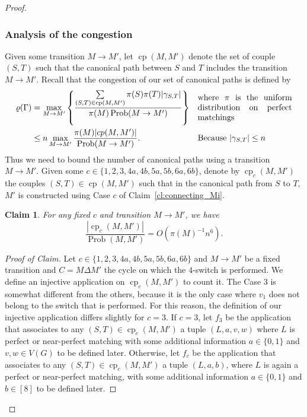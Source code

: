 \documentclass[11pt,a4paper]{article}
\newtheorem{claim}[theorem]{Claim}
\theoremstyle{definition}
\newenvironment{poc}{\begin{proof}[Proof of
    Claim]\renewcommand*{\qedsymbol}{$\blacksquare$}}{\end{proof}}
\DeclareMathOperator{\cp}{cp}
\DeclareMathOperator{\Prob}{Prob}
\begin{document}
\begin{proof}
  \subsubsection*{Analysis of the congestion} 
  Given some transition $M \rightarrow M'$, let $\cp(M,M')$ denote the set of
  couple $(S,T)$ such that the canonical path between $S$ and $T$ includes the
  transition $M \rightarrow M'$. Recall that the congestion of our set of
  canonical paths is defined by
  \begin{align*}
    \varrho(\Gamma) &= \max_{M \rightarrow M'} \left\{\frac{\sum\limits_{(S,T)\in
                      \cp(M,M')} \pi(S)\pi(T)|\gamma_{S,T}|}{\pi(M) \Prob(M
                      \rightarrow M')}\right\} &&\parbox{4cm}{ where  $\pi$ is the
                                                  uniform distribution on
                                                  perfect matchings}\\
    &\le n \max_{M \rightarrow M'} \frac{\pi(M)|cp(M,M')|}{\Prob(M\rightarrow
      M')}. && \parbox{4cm}{ Because $|\gamma_{S,T}| \le n$}
  \end{align*}
  Thus we need to bound the number of canonical paths using a transition
  $M \rightarrow M'$. Given some $c \in \{1,2,3,4a,4b,5a,5b,6a,6b\}$, denote by
  $\cp_c(M,M')$ the couples $(S,T) \in \cp(M,M')$ such that in the canonical
  path from $S$ to $T$, $M'$ is constructed using Case $c$ of
  Claim~\ref{cl:connecting_Mi}.
  \begin{claim}\label{cl:analysis}
    For any fixed $c$ and transition $M \rightarrow M'$, we have
    $$\frac{|\cp_c(M,M')|}{\Prob(M,M')} = O(\pi(M)^{-1}n^6).$$
  \end{claim}
  \begin{poc}
    Let $c \in \{1,2,3,4a,4b,5a,5b,6a,6b\}$ and $M \rightarrow M'$ be a fixed
    transition and $C= M \Delta M'$ the cycle on which the $4$-switch is
    performed. We define an injective application on $\cp_c(M,M')$ to count
    it. The Case 3 is somewhat different from the others, because it is the only
    case where $v_1$ does not belong to the switch that is performed. For this
    reason, the definition of our injective application differs slightly for $c=3$.
    If $c=3$, let $f_3$ be the application that associates to any
    $(S,T) \in \cp_c(M,M')$ a tuple $(L,a,v,w)$ where $L$ is perfect or
    near-perfect matching with some additional information $a \in \{0,1\}$ and
    $v,w \in V(G)$ to be defined later. Otherwise, let $f_c$ be the application
    that associates to any $(S,T) \in \cp_c(M,M')$ a tuple $(L,a,b)$, where $L$
    is again a perfect or near-perfect matching, with some additional
    information $a \in \{0,1\}$ and $b \in [8]$ to be defined later.


\end{poc}
\end{proof}
\end{document}
